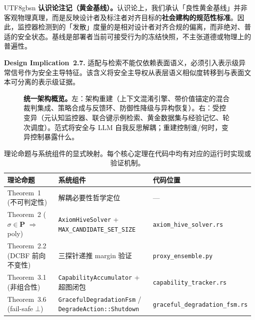 \documentclass[letterpaper,twocolumn,10pt]{article}
\begin{document}
\begin{CJK}{UTF8}{gbsn}
\noindent\textbf{认识论注记（黄金基线）。}认识论上，我们承认「良性黄金基线」并非客观物理真理，而是反映设计者及标注者对齐目标的\textbf{社会建构的规范性标准}。因此，监控器检测到的「发散」度量的是相对设计者对齐合规的偏离，而非绝对、普适的安全状态。基线是部署者当前可接受行为的冻结快照，不主张道德或物理上的普遍性。

\noindent\textbf{Design Implication~2.7.} 适配与检索不能仅依赖表面语义，必须引入表示级异常信号作为安全主导特征。该含义将安全主导权从表层语义相似度转移到与表面文本可分离的表示级证据。

\begin{figure}[t]
\centering
{}
\caption{\textbf{统一架构概览。}左：架构重建（上下文混淆引擎、带价值锚定的混合裁判集成、策略合成与反馈环、防御性降级与异构恢复）。右：受控变异（元认知监控器、联合键示例检索、黄金数据集与经验记忆、轮次调度）。范式将安全与 LLM 自我反思解耦；重建控制谁/何时，变异控制暴露什么。}
\label{fig:framework}
\end{figure}

\begin{table}[t]
\centering
\small
\setlength{\tabcolsep}{2pt}
\begin{tabular}{@{}p{2.2cm}p{3.0cm}p{2.8cm}@{}}
\toprule
\textbf{理论命题} & \textbf{系统组件} & \textbf{代码位置} \\
\midrule
Theorem~1 (不可判定性) & 解耦必要性哲学定位 & --- \\
Theorem~2 ($\sigma \in \mathbf{P}$ $\Rightarrow$ poly) & \texttt{AxiomHiveSolver} + \texttt{MAX\_CANDIDATE\_SET\_SIZE} & \texttt{axiom\_hive\_solver.rs} \\
Theorem~2.2 (DCBF 前向不变性) & 三探针递推 margin 验证 & \texttt{proxy\_ensemble.py} \\
Theorem~3.1 (非组合性) & \texttt{CapabilityAccumulator} + 超图闭包 & \texttt{capability\_tracker.rs} \\
Theorem~3.6 (fail-safe $\bot$) & \texttt{GracefulDegradationFsm} / \texttt{DegradeAction::Shutdown} & \texttt{graceful\_degradation\_fsm.rs} \\
\bottomrule
\end{tabular}
\caption{理论命题与系统组件的显式映射。每个核心定理在代码中均有对应的运行时实现或验证机制。}
\label{tab:theory-system-map}
\end{table}


\end{CJK}
\end{document}
